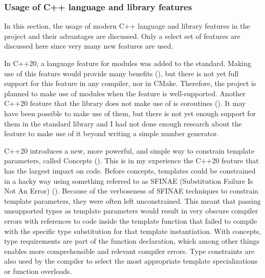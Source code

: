 \documentclass[12pt, a4paper]{article}
\begin{document}
\subsubsection{Usage of C++ language and library features}\label{sec:UsageOfFeatures}
In this section, the usage of modern C++ language and library features in the project and their advantages are discussed. Only a select set of features are discussed here since very many new features are used.

In C++20, a language feature for modules was added to the standard. Making use of this feature would provide many benefits (\cite{AdvantagesOfCppModules}), but there is not yet full support for this feature in any compiler, nor in CMake. Therefore, the project is planned to make use of modules when the feature is well-supported. Another C++20 feature that the library does not make use of is coroutines (\cite{CppCoroutines}). It may have been possible to make use of them, but there is not yet enough support for them in the standard library and I had not done enough research about the feature to make use of it beyond writing a simple number generator.

C++20 introduces a new, more powerful, and simple way to constrain template parameters, called Concepts (\cite{CppConstraints}). This is in my experience the C++20 feature that has the largest impact on code. Before concepts, templates could be constrained in a hacky way using something referred to as SFINAE (Substitution Failure Is Not An Error) (\cite{CppSFINAE}). Because of the verboseness of SFINAE techniques to constrain template parameters, they were often left unconstrained. This meant that passing unsupported types as template parameters would result in very obscure compiler errors with references to code inside the template function that failed to compile with the specific type substitution for that template instantiation. With concepts, type requirements are part of the function declaration, which among other things enables more comprehensible and relevant compiler errors. Type constraints are also used by the compiler to select the most appropriate template specializations or function overloads.
\end{document}
